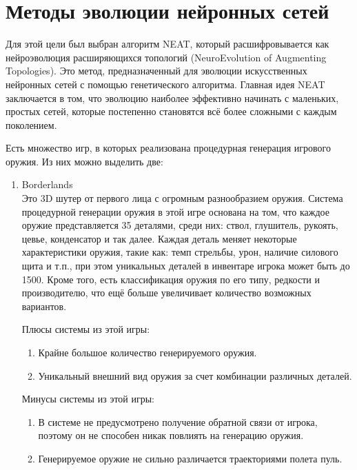 ﻿%
\section{Методы эволюции нейронных сетей}\label{sec:evolutionMethods}

Для этой цели был выбран алгоритм NEAT\cite{s1}, который расшифровывается как нейроэволюция расширяющихся топологий (NeuroEvolution of Augmenting Topologies). Это метод, предназначенный для эволюции искусственных нейронных сетей с помощью генетического алгоритма. Главная идея NEAT заключается в том, что эволюцию наиболее эффективно начинать с маленьких, простых сетей, которые постепенно становятся всё более сложными с каждым поколением.


Есть множество игр, в которых реализована процедурная генерация игрового оружия. Из них можно выделить две:

\begin{enumerate}
    \item Borderlands\cite{s14}\\ Это 3D шутер от первого лица с огромным разнообразием оружия. Система процедурной генерации оружия в этой игре основана на том, что каждое оружие представляется 35 деталями, среди них: ствол, глушитель, рукоять, цевье, конденсатор и так далее. Каждая деталь меняет некоторые характеристики оружия, такие как: темп стрельбы, урон, наличие силового щита и т.п., при этом уникальных деталей в инвентаре игрока может быть до 1500. Кроме того, есть классификация оружия по его типу, редкости и производителю, что ещё больше увеличивает количество возможных вариантов.

    Плюсы системы из этой игры:
    \begin{enumerate}[--]
        \item Крайне большое количество генерируемого оружия.
        \item Уникальный внешний вид оружия за счет комбинации различных деталей.
    \end{enumerate}

    Минусы системы из этой игры:
    \begin{enumerate}[--]
        \item В системе не предусмотрено получение обратной связи от игрока, поэтому он не способен никак повлиять на генерацию оружия.
        \item Генерируемое оружие не сильно различается траекториями полета пуль.
    \end{enumerate}
\end{enumerate}


